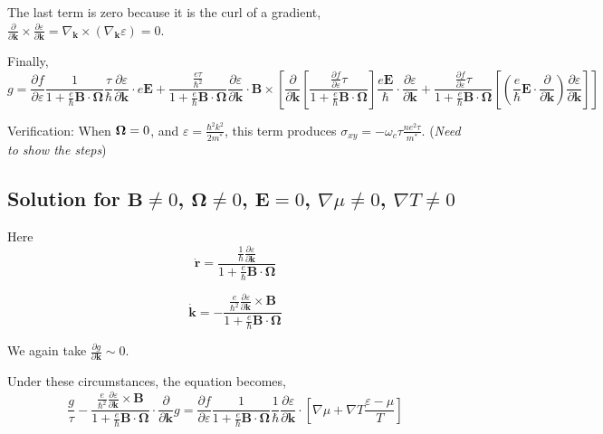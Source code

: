 \documentclass{revtex4-2}
\newcommand{\bvec}[1]{{\mathbf #1}}
\renewcommand\vec[1]{\ensuremath\boldsymbol{#1}} %
\begin{document}
 The last term is zero because it is the curl of a gradient, $\frac{\partial }{\partial \bvec{k}} \times \frac{\partial \varepsilon}{\partial \bvec{k}} = \nabla_\bvec{k} \times (\nabla_\bvec{k} \varepsilon) = 0$.
 
 Finally,
\begin{equation}\label{Eq:gnonzeroE}
 g = \frac{\partial f} {\partial \varepsilon}\frac{1}{1 + \frac{e}{\hbar} \bvec{B}\cdot\bvec{\Omega}}
 \frac{\tau}{\hbar} \frac{\partial \varepsilon}{\partial \bvec{k}}\cdot e \bvec{E} + \frac{\frac{e \tau}{\hbar^2} }{1 + \frac{e}{\hbar} \bvec{B}\cdot\bvec{\Omega}} \frac{\partial \varepsilon}{\partial \bvec{k}} \cdot \bvec{B} \times \left[ \frac{\partial}{\partial \bvec{k}} \left[ \frac{\frac{\partial f} {\partial \varepsilon} \tau}{1 + \frac{e}{\hbar} \bvec{B}\cdot\bvec{\Omega}}
 \right] \frac{e \bvec{E}}{\hbar} \cdot \frac{\partial \varepsilon}{\partial \bvec{k}} + \frac{\frac{\partial f} {\partial \varepsilon} \tau}{1 + \frac{e}{\hbar} \bvec{B}\cdot\bvec{\Omega}} \left[(\frac{e}{\hbar} \bvec{E}\cdot \frac{\partial }{\partial \bvec{k}} )\frac{\partial \varepsilon}{\partial \bvec{k}} \right] \right]
 \end{equation}
 
Verification: When $\vec{\Omega} = 0$, and $\varepsilon = \frac{\hbar^2 k^2}{2 m^*}$, this term produces $\sigma_{xy} = -\omega_c \tau \frac{n e^2 \tau}{m^*}$.
(\textit{Need to show the steps})

\subsection{Solution for $\bvec{B}\neq0$, $\bvec{\Omega}\neq 0$, $\bvec{E} = 0$, $\nabla \mu \neq 0$, $\nabla T \neq 0$}

Here \begin{equation}
\dot{\bvec{r}} = \frac{\frac{1}{\hbar} \frac{\partial \varepsilon}{\partial \bvec{k}}}{1 + \frac{e}{\hbar} \bvec{B}\cdot\bvec{\Omega}}
\end{equation}

\begin{equation}
\dot{\bvec{k}} = -\frac{\frac{e}{\hbar^2} \frac{\partial \varepsilon}{\partial \bvec{k}} \times \bvec{B}}{1 + \frac{e}{\hbar} \bvec{B}\cdot\bvec{\Omega}}
\end{equation}

We again take $\frac{\partial g}{\partial \bvec{k}} \sim 0$.

Under these circumstances, the equation becomes,
$$
\frac{g}{\tau} -\frac{\frac{e}{\hbar^2} \frac{\partial \varepsilon}{\partial \bvec{k}} \times \bvec{B}}{1 + \frac{e}{\hbar} \bvec{B}\cdot\bvec{\Omega}} \cdot\frac{\partial}{\partial \bvec{k}} g = \frac{\partial f}{\partial \varepsilon}\frac{1}{1 + \frac{e}{\hbar} \bvec{B}\cdot\bvec{\Omega}}
\frac{1}{\hbar} \frac{\partial \varepsilon}{\partial \bvec{k}}\cdot\left[ \nabla{\mu} + \nabla T \frac{\varepsilon - \mu}{T}\right] $$
\end{document}

